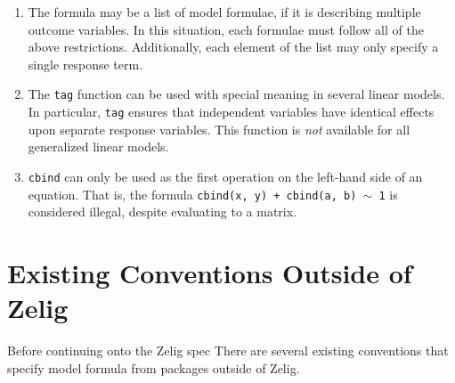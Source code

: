 \documentclass{article}
\newcommand{\tweedly}[0]{$\sim${ }}
\begin{document}
\begin{enumerate}

  \item The formula may be a list of model formulae, if it is describing
    multiple outcome variables. In this situation, each formulae must follow
    all of the above restrictions. Additionally, each element of the list may
    only specify a single response term.

  \item The {\tt tag} function can be used with special meaning in several
    linear models. In particular, {\tt tag} ensures that independent variables
    have identical effects upon separate response variables. This function is
    \emph{not} available for all generalized linear models.

  \item \verb|cbind| can only be used as the first operation on the left-hand side
    of an equation. That is, the formula
    {\tt cbind(x, y) + cbind(a, b) \tweedly 1} is considered illegal, despite
    evaluating to a matrix.


\end{enumerate}



%
%
%
\section{Existing Conventions Outside of Zelig}
\label{sec:existing-elsewhere}

Before continuing onto the Zelig spec
There are several existing conventions that specify model formula from packages
outside of Zelig.
\end{document}
